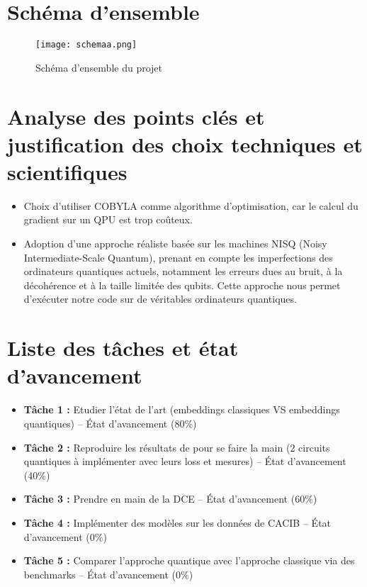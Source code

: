 \documentclass[11pt,a4paper]{article}
\begin{document}
\section{Schéma d'ensemble}
\begin{figure}[h!]
    \centering
    \texttt{[image: schemaa.png]}
    \caption{Schéma d'ensemble du projet}
    \label{fig:schema}
\end{figure}

\section{Analyse des points clés et justification des choix techniques et scientifiques}

\begin{itemize}
    \item Choix d’utiliser COBYLA comme algorithme d’optimisation, car le calcul du gradient sur un QPU est trop coûteux.
    \item Adoption d'une approche réaliste basée sur les machines NISQ (Noisy Intermediate-Scale Quantum), prenant en compte les imperfections des ordinateurs quantiques actuels, notamment les erreurs dues au bruit, à la décohérence et à la taille limitée des qubits. Cette approche nous permet d'exécuter notre code sur de véritables ordinateurs quantiques.
\end{itemize}

\section{Liste des tâches et état d'avancement}

\begin{itemize}
    \item \textbf{Tâche 1 :} Etudier l'état de l'art (embeddings classiques VS embeddings quantiques) -- État d'avancement (80\%)
    \item \textbf{Tâche 2 :} Reproduire les résultats de \cite{1} pour se faire la main (2 circuits quantiques à implémenter avec leurs loss et mesures) -- État d'avancement (40\%)
    \item \textbf{Tâche 3 :} Prendre en main de la DCE -- État d'avancement (60\%)
    \item \textbf{Tâche 4 :} Implémenter des modèles sur les données de CACIB -- État d'avancement (0\%)
    \item \textbf{Tâche 5 :} Comparer l'approche quantique avec l'approche classique via des benchmarks -- État d'avancement (0\%)
\end{itemize}
\end{document}
